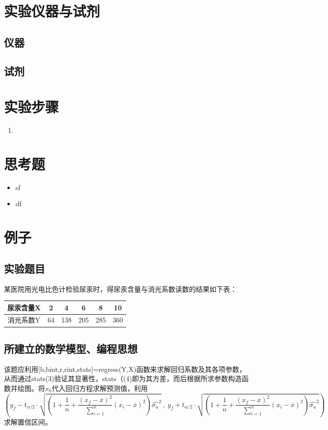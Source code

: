 \documentclass[UTF8,12pt,a4paper]{article}
\begin{document}
\section{实验仪器与试剂}
\subsection{仪器}
\subsection{试剂}

\section{实验步骤}
\begin{enumerate}
	\item 
\end{enumerate}

\section{思考题}
\begin{itemize}
	\item sf
	\item df
\end{itemize}

\section{例子}
\subsection{实验题目}
某医院用光电比色计检验尿汞时，得尿汞含量与消光系数读数的结果如下表：
\begin{table}[!h]
	\centering
	\begin{tabular}{cccccc}
		\toprule
		尿汞含量X & 2     & 4     & 6     & 8     & 10 \\
		\midrule
		消光系数Y & 64    & 138   & 205   & 285   & 360 \\
		\bottomrule
	\end{tabular}%
	\label{tab:exercise8_3}%
\end{table}%

\subsection{所建立的数学模型、编程思想}
该题应利用[b,bint,r,rint,stats]=regress(Y,X)函数来求解回归系数及其各项参数，从而通过stats(3)验证其显著性，stats（(4)即为其方差，而后根据所求参数构造函数并绘图。将$x_0$代入回归方程求解预测值，利用
\begin{equation*}
\scriptstyle\left(y_f-t_{\alpha/2}\cdot\sqrt{\left(1+\dfrac{1}{n}+\dfrac{{\left(x_f-\overline{x}\right)}^2}{\sum_{i=1}^{n}}{{(x_i-\overline{x})}^2}\right)\hat{\sigma_u}^2}\ ,\ y_f+t_{\alpha/2}\cdot\sqrt{\left(1+\dfrac{1}{n}+\dfrac{{\left(x_f-\overline{x}\right)}^2}{\sum_{i=1}^{n}}{{(x_i-\overline{x})}^2}\right)\hat{\sigma_u}^2}\right)
\end{equation*}
求解置信区间。
\end{document}
